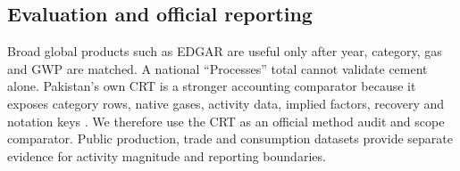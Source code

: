 \subsection{Evaluation and official reporting}

Broad global products such as EDGAR are useful only after year, category, gas and GWP are
matched. A national ``Processes'' total cannot validate cement alone. Pakistan's own CRT is a
stronger accounting comparator because it exposes category rows, native gases, activity data,
implied factors, recovery and notation keys \citep{pakcrt2026}. We therefore use the CRT as an
official method audit and scope comparator. Public production, trade and consumption datasets
provide separate evidence for activity magnitude and reporting boundaries.

